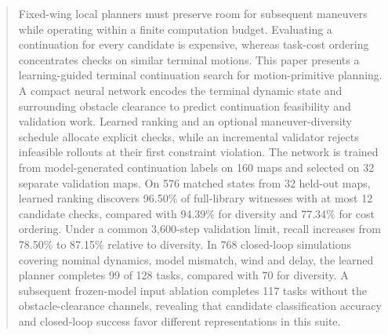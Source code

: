 \begin{abstract}
Fixed-wing local planners must preserve room for subsequent maneuvers while operating within a finite computation budget. Evaluating a continuation for every candidate is expensive, whereas task-cost ordering concentrates checks on similar terminal motions. This paper presents a learning-guided terminal continuation search for motion-primitive planning. A compact neural network encodes the terminal dynamic state and surrounding obstacle clearance to predict continuation feasibility and validation work. Learned ranking and an optional maneuver-diversity schedule allocate explicit checks, while an incremental validator rejects infeasible rollouts at their first constraint violation. The network is trained from model-generated continuation labels on 160 maps and selected on 32 separate validation maps. On 576 matched states from 32 held-out maps, learned ranking discovers 96.50\% of full-library witnesses with at most 12 candidate checks, compared with 94.39\% for diversity and 77.34\% for cost ordering. Under a common 3,600-step validation limit, recall increases from 78.50\% to 87.15\% relative to diversity. In 768 closed-loop simulations covering nominal dynamics, model mismatch, wind and delay, the learned planner completes 99 of 128 tasks, compared with 70 for diversity. A subsequent frozen-model input ablation completes 117 tasks without the obstacle-clearance channels, revealing that candidate classification accuracy and closed-loop success favor different representations in this suite.
\end{abstract}
